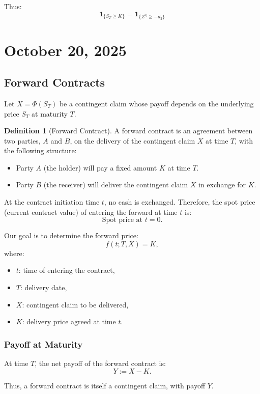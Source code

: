 \documentclass[12pt,a4paper]{article}
\theoremstyle{definition}
\newtheorem{definition}{Definition}[section]
\newcommand{\Q}{\mathbb{Q}}
\begin{document}
Thus:
\[
\mathbf{1}_{\{S_T \geq K\}} = \mathbf{1}_{\{Z^\Q \geq -d_2\}}
\]

\newpage
\section{October 20, 2025}

\subsection{Forward Contracts}

Let $X = \Phi(S_T)$ be a contingent claim whose payoff depends on the underlying price $S_T$ at maturity $T$.

\begin{definition}[Forward Contract]
A forward contract is an agreement between two parties, $A$ and $B$, on the delivery of the contingent claim $X$ at time $T$, with the following structure:
\begin{itemize}
\item Party $A$ (the holder) will pay a fixed amount $K$ at time $T$.
\item Party $B$ (the receiver) will deliver the contingent claim $X$ in exchange for $K$.
\end{itemize}
At the contract initiation time $t$, no cash is exchanged. Therefore, the spot price (current contract value) of entering the forward at time $t$ is:
\[
\text{Spot price at } t = 0.
\]
\end{definition}

Our goal is to determine the forward price:
\[
f(t; T, X) = K,
\]
where:
\begin{itemize}
\item $t$: time of entering the contract,
\item $T$: delivery date,
\item $X$: contingent claim to be delivered,
\item $K$: delivery price agreed at time $t$.
\end{itemize}

\subsubsection{Payoff at Maturity}

At time $T$, the net payoff of the forward contract is:
\[
Y := X - K.
\]

Thus, a forward contract is itself a contingent claim, with payoff $Y$.
\end{document}
